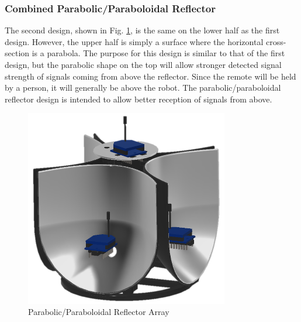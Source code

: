 \subsubsection{Combined Parabolic/Paraboloidal Reflector}\label{subsec:parabolicReflector}
The second design, shown in Fig. \ref{fig:parabolicReflector}, is the same on the lower half as the first design. However, the upper half is simply a surface where the horizontal cross-section is a parabola. The purpose for this design is similar to that of the first design, but the parabolic shape on the top will allow stronger detected signal strength of signals coming from above the reflector. Since the remote will be held by a person, it will generally be above the robot. The parabolic/paraboloidal reflector design is intended to allow better reception of signals from above.
\begin{figure}
    \centering
    \includegraphics[width=3.5in]{figs/img/parabolicReflector.png}
    \caption{Parabolic/Paraboloidal Reflector Array}
    \label{fig:parabolicReflector}
\end{figure}

